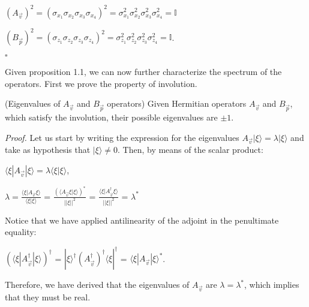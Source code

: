 \documentclass{Configuration_Files/PoliMi3i_thesis}
\begin{document}
\begin{center}
	$(A_{\vec{v}})^{2} = (\sigma_{x_1} \sigma_{x_2} \sigma_{x_3} \sigma_{x_4})^{2} = \sigma_{x_1}^2 \sigma_{x_2}^2 \sigma_{x_3}^2 \sigma_{x_4}^2 = \mathbb{I}$ 
	
	$(B_{\vec{p}})^{2} = (\sigma_{z_1} \sigma_{z_2} \sigma_{z_3} \sigma_{z_4})^{2} = \sigma_{z_1}^2 \sigma_{z_2}^2 \sigma_{z_3}^2 \sigma_{z_4}^2 = \mathbb{I}$.
\end{center}

\hfill $\square$

Given proposition 1.1, we can now further characterize the spectrum of the operators. First we prove the property of involution.

\begin{proposition} (Eigenvalues of $A_{\vec{v}}$ and $B_{\vec{p}}$ operators)
	Given Hermitian operators $A_{\vec{v}}$ and $B_{\vec{p}}$, which satisfy the involution, their possible eigenvalues are $\pm 1$.
\end{proposition}


\textit{Proof.}\newline
Let us start by writing the expression for the eigenvalues $A_{\vec{v}} |\xi \rangle = \lambda |\xi \rangle$ and take as hypothesis that $|\xi \rangle \neq 0$. Then, by means of the scalar product:

\begin{center}
	$\langle \xi|A_{\vec{v}}|\xi \rangle = \lambda \langle \xi | \xi \rangle$,
	
	$\lambda = \frac {\langle \xi|A_{\vec{v}}\xi \rangle}{\langle \xi |\xi \rangle}$ = $\frac {(\langle A_{\vec{v}}\xi|\xi \rangle)^*}{||\xi||^2}$ = $\frac {\langle \xi|A_{\vec{v}}^{\dagger}\xi \rangle}{||\xi||^2}$ = $\lambda^*$ 
\end{center}

Notice that we have applied antilinearity of the adjoint in the penultimate equality: 

\begin{center}
	$(\langle \xi|A_{\vec{v}}^{\dagger}|\xi \rangle)^{\dagger}$ = $|\xi\rangle^{\dagger} (A_{\vec{v}}^{\dagger})^{\dagger} \langle\xi|^{\dagger}$ = $\langle \xi|A_{\vec{v}}|\xi \rangle^*$.  
\end{center}

Therefore, we have derived that the eigenvalues of $A_{\vec{v}}$ are $\lambda = \lambda^*$, which implies that they must be real.

\end{document}
